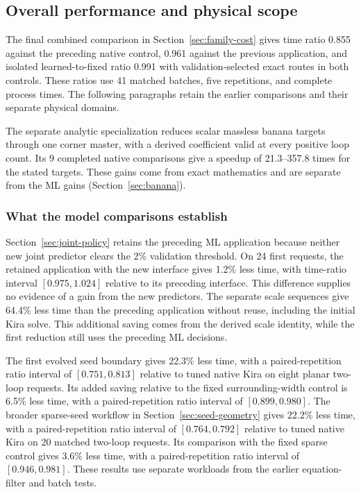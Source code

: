 \subsection{Overall performance and physical scope}
The final combined comparison in Section~\ref{sec:family-cost} gives time ratio 0.855 against the preceding native control, 0.961 against the previous application, and isolated learned-to-fixed ratio 0.991 with validation-selected exact routes in both controls. These ratios use 41 matched batches, five repetitions, and complete process times. The following paragraphs retain the earlier comparisons and their separate physical domains.

\label{history:sec:overall}
The separate analytic specialization reduces scalar massless banana targets through one corner master, with a derived coefficient valid at every positive loop count. Its 9 completed native comparisons give a speedup of 21.3--357.8 times for the stated targets. These gains come from exact mathematics and are separate from the ML gains (Section~\ref{sec:banana}).
\subsubsection{What the model comparisons establish}
Section~\ref{sec:joint-policy} retains the preceding ML application because neither new joint predictor clears the 2\% validation threshold. On 24 first requests, the retained application with the new interface gives 1.2\% less time, with time-ratio interval $[0.975,1.024]$ relative to its preceding interface. This difference supplies no evidence of a gain from the new predictors. The separate scale sequences give 64.4\% less time than the preceding application without reuse, including the initial Kira solve. This additional saving comes from the derived scale identity, while the first reduction still uses the preceding ML decisions.

The first evolved seed boundary gives 22.3\% less time, with a paired-repetition ratio interval of $[0.751, 0.813]$ relative to tuned native Kira on eight planar two-loop requests. Its added saving relative to the fixed surrounding-width control is 6.5\% less time, with a paired-repetition ratio interval of $[0.899, 0.980]$. The broader sparse-seed workflow in Section~\ref{sec:seed-geometry} gives 22.2\% less time, with a paired-repetition ratio interval of $[0.764, 0.792]$ relative to tuned native Kira on 20 matched two-loop requests. Its comparison with the fixed sparse control gives 3.6\% less time, with a paired-repetition ratio interval of $[0.946, 0.981]$. These results use separate workloads from the earlier equation-filter and batch tests.

